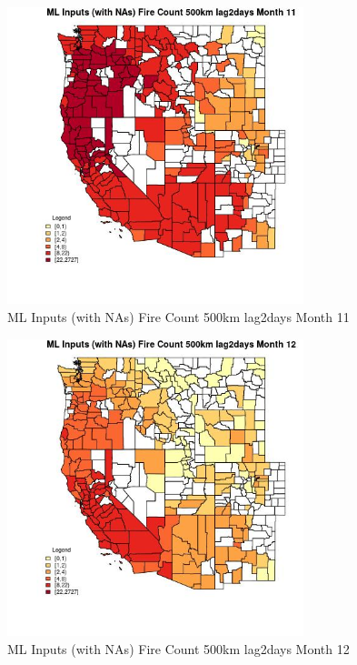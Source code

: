 \begin{figure} 
\centering  
\includegraphics[width=0.77\textwidth]{Code_Outputs/Report_ML_input_PM25_Step4_part_f_de_duplicated_aves_prioritize_24hr_obswNAs_CountyFire_Count_500km_lag2daysmedianMonth11.jpg} 
\caption{\label{fig:Report_ML_input_PM25_Step4_part_f_de_duplicated_aves_prioritize_24hr_obswNAsCountyFire_Count_500km_lag2daysmedianMonth11}ML Inputs (with NAs) Fire Count 500km lag2days Month 11} 
\end{figure} 
 

\begin{figure} 
\centering  
\includegraphics[width=0.77\textwidth]{Code_Outputs/Report_ML_input_PM25_Step4_part_f_de_duplicated_aves_prioritize_24hr_obswNAs_CountyFire_Count_500km_lag2daysmedianMonth12.jpg} 
\caption{\label{fig:Report_ML_input_PM25_Step4_part_f_de_duplicated_aves_prioritize_24hr_obswNAsCountyFire_Count_500km_lag2daysmedianMonth12}ML Inputs (with NAs) Fire Count 500km lag2days Month 12} 
\end{figure} 
 

